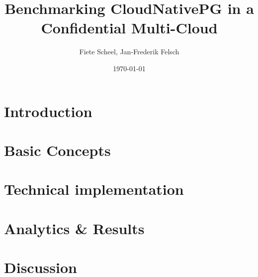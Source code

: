 \documentclass[a4paper, ngerman, 12pt]{scrreprt}
\begin{document}
\title{Benchmarking CloudNativePG in a Confidential Multi-Cloud} %
\author{Fiete Scheel, Jan-Frederik Felsch} %
\date{\today} %

\maketitle

\tableofcontents
\newpage

\chapter{Introduction}


\chapter{Basic Concepts}


\chapter{Technical implementation}


\chapter{Analytics \& Results}


\chapter{Discussion}


\printbibliography


\end{document}
